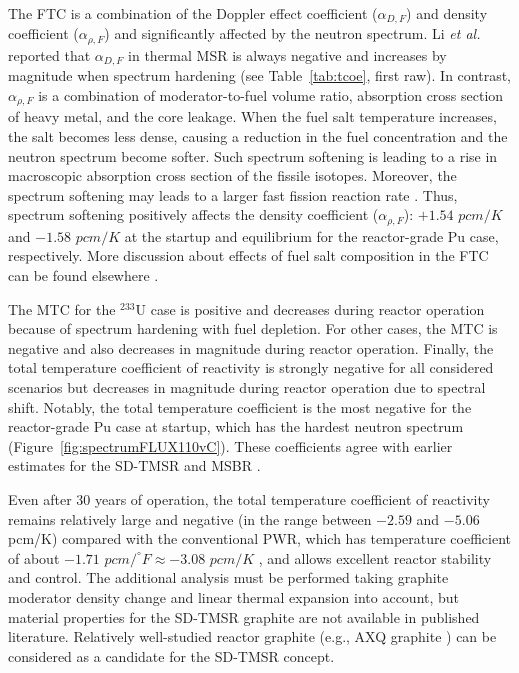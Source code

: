 The \gls{FTC} is a combination of the Doppler effect coefficient 
($\alpha_{D,F}$) and density coefficient ($\alpha_{\rho,F}$) and significantly 
affected by the neutron spectrum. Li \emph{et al.} reported that 
$\alpha_{D,F}$ in thermal \gls{MSR} is always negative and increases by 
magnitude when spectrum hardening (see Table~\ref{tab:tcoe}, first raw). 
In contrast, $\alpha_{\rho,F}$ is a combination of moderator-to-fuel volume 
ratio, absorption cross section of heavy metal, and the core leakage. When the 
fuel salt temperature increases, the salt becomes less dense, causing a 
reduction in the fuel concentration and the neutron spectrum become softer. 
Such spectrum softening is leading to a rise in macroscopic absorption cross 
section of the fissile isotopes. Moreover, the spectrum softening may leads to 
a larger fast fission reaction rate \cite{li_effects_2018-1}. Thus, spectrum 
softening positively affects the density coefficient ($\alpha_{\rho,F}$): 
$+1.54$ $pcm/K$ and $-1.58$ $pcm/K$ at the startup and equilibrium for the 
reactor-grade Pu case, respectively. More discussion about effects of fuel 
salt composition in the \gls{FTC} can be found elsewhere 
\cite{li_effects_2018-1}.

The \gls{MTC} for the $^{233}$U case is positive and decreases during reactor 
operation because of spectrum hardening with fuel depletion. For other cases, 
the \gls{MTC} is negative and also decreases in magnitude during reactor  
operation. Finally, the total temperature coefficient of reactivity is 
strongly negative for all considered scenarios but decreases in magnitude 
during reactor operation due to spectral shift. Notably, the total temperature 
coefficient is the most negative for the reactor-grade Pu case at startup, 
which has the hardest neutron spectrum (Figure~\ref{fig:spectrumFLUX110vC}). 
These coefficients agree with earlier estimates for the SD-TMSR 
\cite{li_optimization_2018, ashraf2019whole_core} and \gls{MSBR} 
\cite{rykhlevskii2019modeling, rykhlevskii_full-core_2017,  
robertson_conceptual_1971}.

Even after 30 years of operation, the total temperature coefficient of 
reactivity remains relatively large and negative (in the range between $-2.59$ 
and $-5.06$ pcm/K) compared with the conventional \gls{PWR}, which has 
temperature coefficient of about $-1.71$ $pcm/^{\circ}F\approx -3.08$ $pcm/K$ 
\cite{forget_integral_2018}, and allows excellent reactor stability and 
control. The additional analysis must be performed taking graphite moderator 
density change and linear thermal expansion into account, but material 
properties for the SD-TMSR graphite are not available in published literature. 
Relatively well-studied reactor graphite (e.g., AXQ graphite 
\cite{robertson_conceptual_1971}) can be considered as a candidate for the 
SD-TMSR concept.

